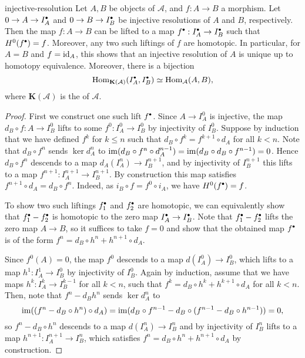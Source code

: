 \begin{example}{injective-resolution}
    Let $A, B$ be objects of $\mathcal{A}$, and $f : A \to B$ a morphism. Let $0 \to A \to I_A^\bdot$ and $0 \to B \to I_B^\bdot$ be injective resolutions of $A$ and $B$, respectively. Then the map $f : A \to B$ can be lifted to a map $f^\bdot : I_A^\bdot \to I_B^\bdot$ such that $H^0(f^\bdot) = f$. Moreover, any two such liftings of $f$ are homotopic. In particular, for $A = B$ and $f = \text{id}_A$, this shows that an injective resolution of $A$ is unique up to homotopy equivalence. Moreover, there is a bijection
    \[ \Hom_{\textbf{K}(\mathcal{A})}(I_A^\bdot, I_B^\bdot) \simeq \Hom_{\mathcal{A}}(A, B) , \]
    where $\textbf{K}(\mathcal{A})$ is the  of $\mathcal{A}$.
    \begin{proof}
        First we construct one such lift $f^\bdot$. Since $A \to I_A^0$ is injective, the map $d_B \circ f : A \to I_B^0$ lifts to some $f^0 : I_A^0 \to I_B^0$ by injectivity of $I_B^0$. Suppose by induction that we have defined $f^k$ for $k \le n$ such that $d_B \circ f^k = f^{k + 1} \circ d_A$ for all $k < n$. Note that $d_B \circ f^n$ sends $\ker d_A^n$ to $\operatorname{im} (d_B \circ f^n \circ d_A^{n - 1}) = \operatorname{im} (d_B \circ d_B \circ f^{n - 1}) = 0$. Hence $d_B \circ f^n$ descends to a map $d_A(I_A^n) \to I_B^{n + 1}$, and by injectivity of $I_B^{n + 1}$ this lifts to a map $f^{n + 1} : I_A^{n + 1} \to I_B^{n + 1}$. By construction this map satisfies $f^{n + 1} \circ d_A = d_B \circ f^n$. Indeed, as $i_B \circ f = f^0 \circ i_A$, we have $H^0(f^\bdot) = f$.
    
        To show two such liftings $f_1^\bdot$ and $f_2^\bdot$ are homotopic, we can equivalently show that $f_1^\bdot - f_2^\bdot$ is homotopic to the zero map $I_A^\bdot \to I_B^\bdot$. Note that $f_1^\bdot - f_2^\bdot$ lifts the zero map $A \to B$, so it suffices to take $f = 0$ and show that the obtained map $f^\bdot$ is of the form $f^n = d_B \circ h^n + h^{n + 1} \circ d_A$.
    
        Since $f^0(A) = 0$, the map $f^0$ descends to a map $d(I_A^0) \to I_B^0$, which lifts to a map $h^1 : I_A^1 \to I_B^0$ by injectivity of $I_B^0$. Again by induction, assume that we have maps $h^k : I_A^k \to I_B^{k - 1}$ for all $k < n$, such that $f^k = d_B \circ h^k + h^{k + 1} \circ d_A$ for all $k < n$. Then, note that $f^n - d_B h^n$ sends $\ker d_A^n$ to
        \[ \operatorname{im} ((f^n - d_B \circ h^n) \circ d_A) = \operatorname{im} (d_B \circ f^{n - 1} - d_B \circ (f^{n - 1} - d_B \circ h^{n - 1})) = 0 , \]
        so $f^n - d_B \circ h^n$ descends to a map $d(I_A^n) \to I_B^n$ and by injectivity of $I_B^n$ lifts to a map $h^{n + 1} : I_A^{n + 1} \to I_B^n$, which satisfies $f^n = d_B \circ h^n + h^{n + 1} \circ d_A$ by construction.
    \end{proof}
\end{example}


